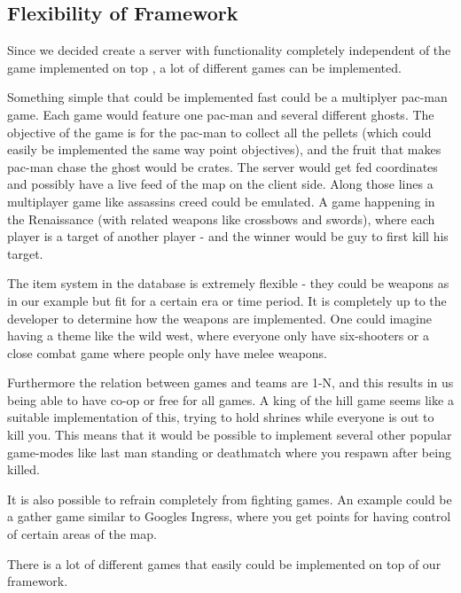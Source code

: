 \subsection{Flexibility of Framework}\label{subsec:game-scenarios}
Since we decided create a server with functionality completely independent of the game implemented on top , a lot of different games can be implemented. 

Something simple that could be implemented fast could be a multiplyer pac-man game. Each game would feature one pac-man and several different ghosts. The objective of the game is for the pac-man to collect all the pellets (which could easily be implemented the same way point objectives), and the fruit that makes pac-man chase the ghost would be crates. The server would get fed coordinates and possibly have a live feed of the map on the client side.
Along those lines a multiplayer game like assassins creed could be emulated. A game happening in the Renaissance (with related weapons like crossbows and swords), where each player is a target of another player - and the winner would be guy to first kill his target.

The item system in the database is extremely flexible - they could be weapons as in our example but fit for a certain era or time period. It is completely up to the developer to determine how the weapons are implemented. One could imagine having a theme like the wild west, where everyone only have six-shooters or a close combat game where people only have melee weapons. 

Furthermore the relation between games and teams are 1-N, and this results in us being able to have co-op or free for all games. A king of the hill game seems like a suitable implementation of this, trying to hold shrines while everyone is out to kill you. This means that it would be possible to implement several other popular game-modes like last man standing or deathmatch where you respawn after being killed.

It is also possible to refrain completely from fighting games. An example could be a gather game similar to Googles Ingress, where you get points for having control of certain areas of the map.

There is a lot of different games that easily could be implemented on top of our framework.


